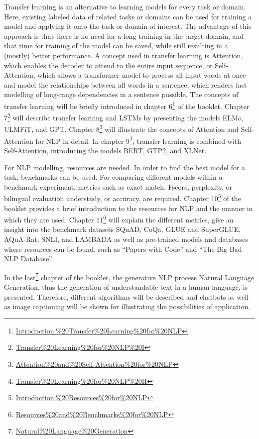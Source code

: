 \documentclass[]{krantz}
\renewcommand{\href}[2]{#2\footnote{\url{#1}}}
\begin{document}
Transfer learning is an alternative to learning models for every task or domain. Here, existing labeled data of related tasks or domains can be used for training a model and applying it onto the task or domain of interest. The advantage of this approach is that there is no need for a long training in the target domain, and that time for training of the model can be saved, while still resulting in a (mostly) better performance. A concept used in transfer learning is Attention, which enables the decoder to attend to the entire input sequence, or Self-Attention, which allows a transformer model to process all input words at once and model the relationships between all words in a sentence, which renders fast modelling of long-range dependencies in a sentence possible.
The concepts of transfer learning will be briefly introduced in chapter \href{Introduction:\%20Transfer\%20Learning\%20for\%20NLP}{6} of the booklet. Chapter \href{Transfer\%20Learning\%20for\%20NLP\%20I}{7} will describe transfer learning and LSTMs by presenting the models ELMo, ULMFiT, and GPT. Chapter \href{Attention\%20and\%20Self-Attention\%20for\%20NLP}{8} will illustrate the concepts of Attention and Self-Attention for NLP in detail. In chapter \href{Transfer\%20Learning\%20for\%20NLP\%20II}{9}, transfer learning is combined with Self-Attention, introducing the models BERT, GTP2, and XLNet.

For NLP modelling, resources are needed. In order to find the best model for a task, benchmarks can be used. For comparing different models within a benchmark experiment, metrics such as exact match, F\beta score, perplexity, or bilingual evaluation understudy, or accuracy, are required.
Chapter \href{Introduction:\%20Resources\%20for\%20NLP}{10} of the booklet provides a brief introduction to the resources for NLP and the manner in which they are used. Chapter \href{Resources\%20and\%20Benchmarks\%20for\%20NLP}{11} will explain the different metrics, give an insight into the benchmark datasets SQuAD, CoQa, GLUE and SuperGLUE, AQuA-Rat, SNLI, and LAMBADA as well as pre-trained models and databases where resources can be found, such as ``Papers with Code'' and ``The Big Bad NLP Database''.

In the \href{Natural\%20Language\%20Generation}{last} chapter of the booklet, the generative NLP process Natural Language Generation, thus the generation of understandable text in a human language, is presented. Therefore, different algorithms will be described and chatbots as well as image captioning will be shown for illustrating the possibilities of application.
\end{document}
